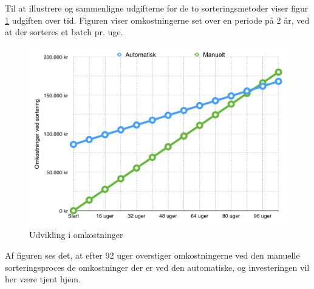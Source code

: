 \newpage
Til at illustrere og sammenligne udgifterne for de to sorteringsmetoder viser figur \ref{fig:costbenefit} udgiften over tid. Figuren viser omkostningerne set over en periode på 2 år, ved at der sorteres et batch pr. uge.

\begin{figure}[H]
	\centering
	\includegraphics[width=1\textwidth]{billeder/Hovedrapport/costbenefit2.png}
	\caption{Udvikling i omkostninger }
	\label{fig:costbenefit}
\end{figure}

Af figuren ses det, at efter 92 uger overstiger omkostningerne ved den manuelle sorteringsproces de omkostninger der er ved den automatiske, og investeringen vil her være tjent hjem. 